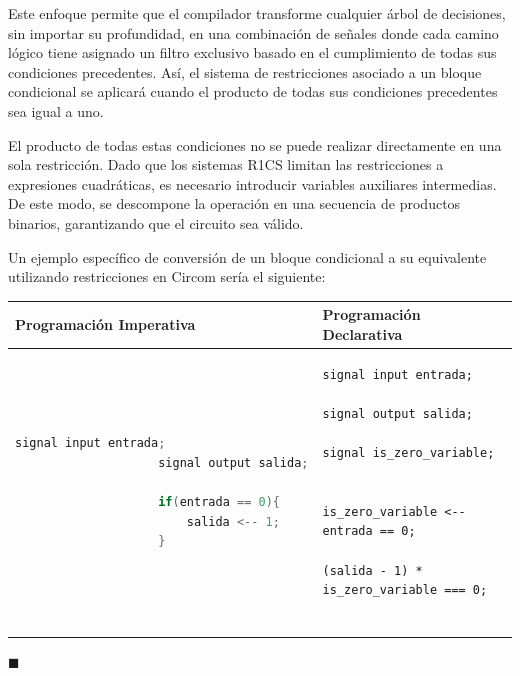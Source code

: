\documentclass[a4paper,12pt]{report}
\begin{document}
	\vspace{0.3cm}
	\noindent Este enfoque permite que el compilador transforme cualquier árbol de decisiones, sin importar su profundidad, en una combinación de señales donde cada camino lógico tiene asignado un filtro exclusivo basado en el cumplimiento de todas sus condiciones precedentes. Así, el sistema de restricciones asociado a un bloque condicional se aplicará cuando el producto de todas sus condiciones precedentes sea igual a uno.
	
	\vspace{0.3cm}
	\noindent El producto de todas estas condiciones no se puede realizar directamente en una sola restricción. Dado que los sistemas R1CS limitan las restricciones a expresiones cuadráticas, es necesario introducir variables auxiliares intermedias. De este modo, se descompone la operación en una secuencia de productos binarios, garantizando que el circuito sea válido.
	
	\vspace{0.3cm}
	\noindent Un ejemplo específico de conversión de un bloque condicional a su equivalente utilizando restricciones en Circom sería el siguiente:
	
	\vspace{0.3cm}
	
	\begin{mi_ejemplo}
		\centering
		\begin{tabular}{|>{\raggedright\arraybackslash}p{} | >{\raggedright\arraybackslash}p{}|}%
			\hline
			\textbf{Programación Imperativa} & \textbf{Programación Declarativa} \\
			\hline
			
			\begin{minipage}[t]{0.48\textwidth}
				\begin{lstlisting}[language=C,xleftmargin=-55pt,frame=none,numbers=none]
					signal input entrada;
					signal output salida;
					
					if(entrada == 0){ 
						salida <-- 1;
					} 
				\end{lstlisting} 
			\end{minipage}
			&
			\begin{minipage}[t]{0.48\textwidth}
				\begin{lstlisting}[language=Circom,xleftmargin=-55pt,frame=none,numbers=none]
					signal input entrada;
					signal output salida;
					signal is_zero_variable;
					
					is_zero_variable <-- entrada == 0;
					(salida - 1) * is_zero_variable === 0;
					
				\end{lstlisting}
			\end{minipage}
			\\ \hline
		\end{tabular}
		
		\caption{Comparación entre bloque condicional imperativo y declarativo}
		\label{ex:c-circom-condicional}
		\vspace{0.2cm}
		\hspace*{\fill} $\blacksquare$
	\end{mi_ejemplo}
	
\end{document}

